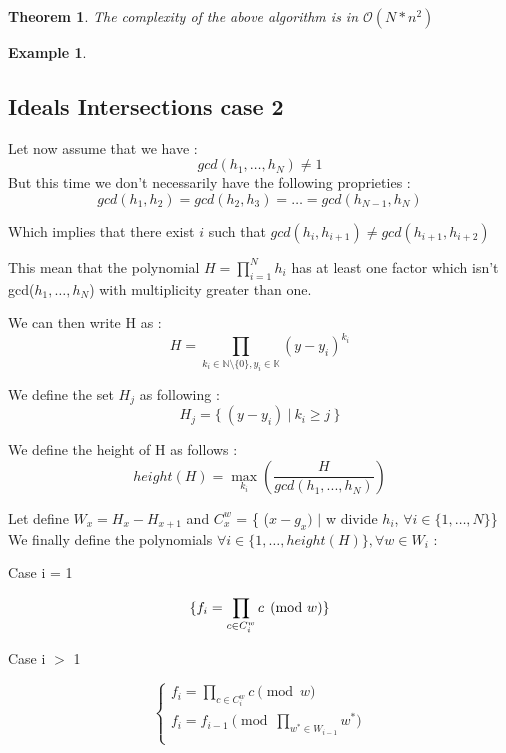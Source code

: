 \documentclass{article}
\newtheorem{theorem}{Theorem}[section]
\newtheorem{example}{Example}[section]
\begin{document}
\begin{theorem} The complexity of the above algorithm is in $\mathcal{O}(N*n^2)$
\end{theorem}


\begin {example}

\end{example}


\newpage
\subsection*{Ideals Intersections case 2}

Let now assume that we have : 
\[gcd(h_{1},\dots,h_{N}) \neq 1\]
But this time we don't necessarily have the following proprieties :
\[gcd(h_{1},h_{2}) = gcd(h_{2},h_{3}) = \dots = gcd(h_{N-1},h_{N}) \]

Which implies that there exist $i$ such that $gcd(h_{i},h_{i+1}) \neq gcd(h_{i+1},h_{i+2})$

This mean that the polynomial $H = \prod_{i=1}^{N} h_{i}$ has at least one factor which isn't gcd($h_{1},\dots,h_{N}$) with multiplicity greater than one.

We can then write H as :
\[H=\prod_{k_{i} \in \mathbb{N}
 \setminus \{0\}, y_{i}\in \mathbb{K}} (y-y_{i})^{k_{i}}\]

We define the set $H_{j}$ as following :
\[H_{j} = \{\ (y-y_{i}) \ |\  k_{i} \geq j\ \}\]

We define the height of H as follows : \[height(H) = \max_{k_{i}}(\frac{H}{gcd(h_{1},...,h_{N})})\]

Let define $W_{x} = H_{x}-H_{x+1}$ and $C_{x}^{w}$ = \{ ($x-g_{x})$ $|$ w divide $h_{i}$, $\forall i \in \{1,\dots,N\}$\}\newline
We finally define the polynomials $\forall i \in \{1,\dots,height(H)\}, \forall w \in W_{i}$ :

Case i = 1

\[\{ f_{i} = \prod_{c \in C_{i}^{w} } c \pmod w \\ \}\]


Case i $>$ 1

\begin{displaymath}
    \left\{
    \begin{array}{ll}
    f_{i} = \prod_{c \in C_{i}^{w} } c \pmod w \\
    f_{i} = f_{i-1} \pmod{\prod_{w^{*} \in W_{i-1}} w^{*}}\\
    \end{array}
    \right.
\end{displaymath}
\end{document}
